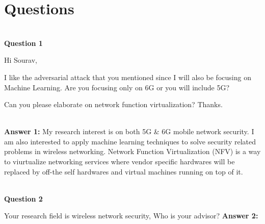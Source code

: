 \documentclass[journal]{IEEEtran}
\begin{document}
\section{Questions}
\\
\textbf{Question 1}

Hi Sourav,

I like the adversarial attack that you mentioned since I will also be focusing on Machine Learning. Are you focusing only on 6G or you will include 5G?


Can you please elaborate on network function virtualization? Thanks.

\\
\textbf{Answer 1:}
My research interest is on both 5G & 6G mobile network security. I am also interested to apply machine learning techniques to solve security related problems in wireless networking.
Network Function Virtualization (NFV) is a way to viurtualize networking services where vendor specific hardwares will be replaced by off-the self hardwares and virtual machines running on top of it.

\\
\textbf{Question 2}

Your research field is wireless network security, Who is your advisor?
\textbf{Answer 2:}
\end{document}

